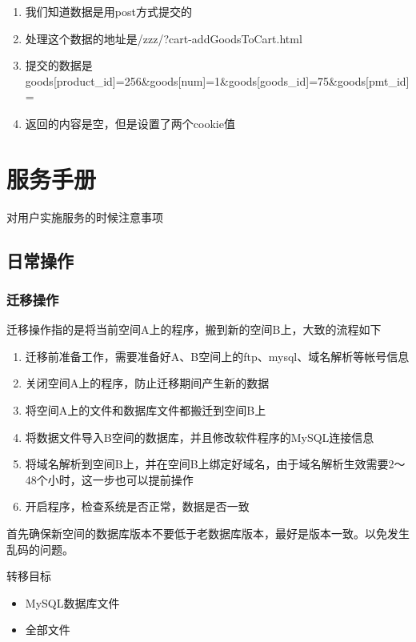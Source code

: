 \documentclass{article}
\begin{document}
\begin{enumerate}
\item 我们知道数据是用post方式提交的
\item 处理这个数据的地址是/zzz/?cart-addGoodsToCart.html 
\item 提交的数据是goods[product\_id]=256\&goods[num]=1\&goods[goods\_id]=75\&goods[pmt\_id]=
\item 返回的内容是空，但是设置了两个cookie值
\end{enumerate}

\clearpage

\hypertarget{toc16}{}
\section{服务手册}
对用户实施服务的时候注意事项

\hypertarget{toc17}{}
\subsection{日常操作}
\hypertarget{toc18}{}
\subsubsection{迁移操作}
迁移操作指的是将当前空间A上的程序，搬到新的空间B上，大致的流程如下

\begin{enumerate}
\item 迁移前准备工作，需要准备好A、B空间上的ftp、mysql、域名解析等帐号信息
\item 关闭空间A上的程序，防止迁移期间产生新的数据
\item 将空间A上的文件和数据库文件都搬迁到空间B上
\item 将数据文件导入B空间的数据库，并且修改软件程序的MySQL连接信息
\item 将域名解析到空间B上，并在空间B上绑定好域名，由于域名解析生效需要2～48个小时，这一步也可以提前操作
\item 开启程序，检查系统是否正常，数据是否一致
\end{enumerate}

首先确保新空间的数据库版本不要低于老数据库版本，最好是版本一致。以免发生乱码的问题。

转移目标

\begin{itemize}
\item MySQL数据库文件
\item 全部文件
\end{itemize}
\end{document}

